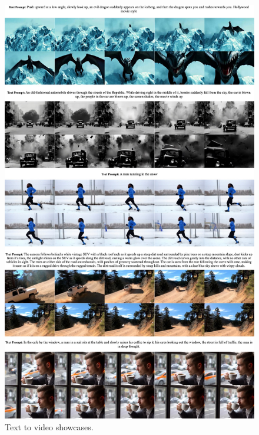 \begin{figure}[ht]
\vspace{-0.5em}
\begin{center}
\includegraphics[width=0.98\linewidth]{images/t2v/goodcase2.jpg}
\end{center}
\vspace{-0.5em}
\caption{Text to video showcases.}
\label{fig:t2vgood2}
\end{figure}
